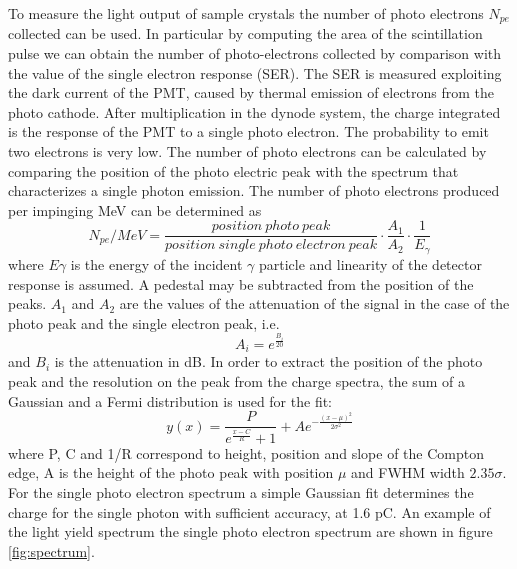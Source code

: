 To measure the light output of sample crystals the number of photo electrons $N_{pe}$ collected can be used.
In particular by computing the area of the scintillation pulse we can obtain the number of photo-electrons collected by comparison with the value of the single electron response (SER).
The SER is measured exploiting the dark current of the PMT, caused by thermal emission of electrons from the photo cathode.
After multiplication in the dynode system, the charge integrated is the response of the PMT to a single photo electron.
The probability to emit two electrons is very low.
The number of photo electrons can be calculated by comparing the position of the photo electric peak with the spectrum that characterizes a single photon emission. The number of photo electrons produced per impinging MeV can be determined as
\begin{equation}
N_{pe}/MeV=\frac{position\ photo\ peak}{position\ single\ photo\ electron\ peak} \cdot \frac{A_{1}}{A_{2}} \cdot \frac{1}{E_{\gamma}}
\end{equation}
where $E\gamma$ is the energy of the incident $\gamma$ particle and linearity of the detector response is assumed. A pedestal may be subtracted from the position of the peaks. $A_{1}$ and $A_{2}$ are the values of the attenuation of the signal in the case of the photo peak and the single electron peak, i.e.
\begin{equation}
A_{i}=e^{\frac{B_{i}}{20}}
\end{equation}
and $B_{i}$ is the attenuation in dB.
In order to extract the position of the photo peak and the resolution on the peak  from the charge spectra, the sum of a Gaussian and a Fermi distribution is used for the fit:
\begin{equation}
y(x)=\frac{P}{e^{\frac{x-C}{R}}+1}+Ae^{-\frac{(x-\mu)^{2}}{2\sigma ^{2}}}
\end{equation}
where P, C and 1/R correspond to height, position and slope of the Compton edge, A is the height of the photo peak with position $\mu$ and FWHM width $2.35\sigma$.
For the single photo electron spectrum a simple Gaussian fit determines the charge for the single photon with sufficient accuracy, at 1.6 pC.
An example of the light yield spectrum the single photo electron spectrum are shown in figure \ref{fig:spectrum}.
